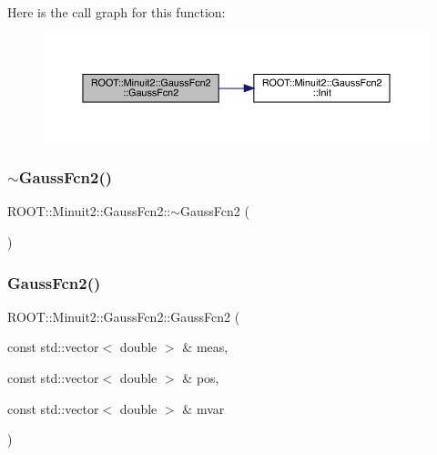 Here is the call graph for this function\+:\nopagebreak
\begin{figure}[H]
\begin{center}
\leavevmode
\includegraphics[width=350pt]{da/d5d/classROOT_1_1Minuit2_1_1GaussFcn2_a2904a79650d89e25591d84060e986271_cgraph}
\end{center}
\end{figure}
\mbox{\label{classROOT_1_1Minuit2_1_1GaussFcn2_ab37a15b9986eab678018570c2a744799}} 
\subsubsection{\texorpdfstring{$\sim$GaussFcn2()}{~GaussFcn2()}\hspace{0.1cm}{\footnotesize\ttfamily [1/2]}}
{\footnotesize\ttfamily R\+O\+O\+T\+::\+Minuit2\+::\+Gauss\+Fcn2\+::$\sim$\+Gauss\+Fcn2 (\begin{DoxyParamCaption}{ }\end{DoxyParamCaption})\hspace{0.3cm}{\ttfamily [inline]}}

\mbox{\label{classROOT_1_1Minuit2_1_1GaussFcn2_a2904a79650d89e25591d84060e986271}} 
\subsubsection{\texorpdfstring{GaussFcn2()}{GaussFcn2()}\hspace{0.1cm}{\footnotesize\ttfamily [2/2]}}
{\footnotesize\ttfamily R\+O\+O\+T\+::\+Minuit2\+::\+Gauss\+Fcn2\+::\+Gauss\+Fcn2 (\begin{DoxyParamCaption}\item[{const std\+::vector$<$ double $>$ \&}]{meas,  }\item[{const std\+::vector$<$ double $>$ \&}]{pos,  }\item[{const std\+::vector$<$ double $>$ \&}]{mvar }\end{DoxyParamCaption})\hspace{0.3cm}{\ttfamily [inline]}}

